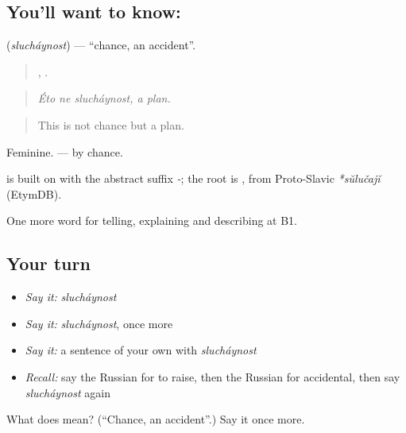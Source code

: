 \subsection*{You'll want to know: }
\textbf{} (\emph{slucháynost}) — \textquotedblleft{}chance, an accident\textquotedblright{}.

\begin{quote}
  ,  .
\end{quote}

\begin{quote}
\emph{Éto ne slucháynost, a plan.}
\end{quote}

\begin{quote}
This is not chance but a plan.
\end{quote}

Feminine. \emph{ } — by chance.

\begin{cousinweb}
\textbf{} is built on \emph{} with the abstract suffix \emph{-}; the root is \emph{}, from Proto-Slavic \emph{*sŭlučajĭ} (EtymDB).
\end{cousinweb}

\begin{grammarlens}[title={What you've built}]
One more word for telling, explaining and describing at B1.
\end{grammarlens}

\subsection*{Your turn}
\begin{itemize}
\raggedright
  \item \emph{Say it:} \emph{slucháynost}
  \item \emph{Say it:} \emph{slucháynost}, once more
  \item \emph{Say it:} a sentence of your own with \emph{slucháynost}
  \item \emph{Recall:} say the Russian for to raise, then the Russian for accidental, then say \emph{slucháynost} again
\end{itemize}

\begin{tcolorbox}[breakable,colback=teal!4,colframe=teal!35!black,title={Before you move on}]
What does  mean? (\textquotedblleft{}Chance, an accident\textquotedblright{}.) Say it once more.
\end{tcolorbox}

